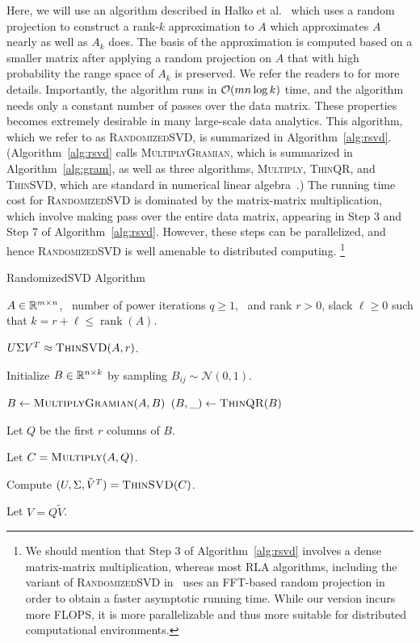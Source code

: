 Here, we will use an algorithm described in Halko et al.~\cite{HMT09_SIREV} which uses a random projection to construct a rank-$k$ approximation to $A$ which approximates $A$ nearly as well as $A_k$ does.
The basis of the approximation is computed based on a smaller matrix after applying a random projection on $A$ that with high probability the range space of $A_k$ is preserved. We refer the readers to \cite{HMT09_SIREV,Mah-mat-rev_BOOK} for more details.
Importantly, the algorithm runs in $\operatorname{\mathcal{O}}(mn \log k)$ time, and the algorithm needs only a constant number of passes over the data matrix. 
These properties becomes extremely desirable in many large-scale data analytics. 
This algorithm, which we refer to as \textsc{RandomizedSVD}, is summarized in Algorithm~\ref{alg:rsvd}.
(Algorithm~\ref{alg:rsvd} calls \textsc{MultiplyGramian}, which is summarized in Algorithm~\ref{alg:gram}, as well as three algorithms, \textsc{Multiply}, \textsc{ThinQR}, and \textsc{ThinSVD}, which are standard in numerical linear algebra~\cite{GVL96}.) 
The running time cost for \textsc{RandomizedSVD} is dominated by the matrix-matrix multiplication, which involve making pass over the entire data matrix, appearing in Step 3 and Step 7 of Algorithm~\ref{alg:rsvd}.
However, these steps can be parallelized, and hence \textsc{RandomizedSVD} is well amenable to distributed computing.%
\footnote{We should mention that Step 3 of Algorithm~\ref{alg:rsvd} involves a dense matrix-matrix multiplication, whereas most RLA algorithms, including the variant of \textsc{RandomizedSVD} in~\cite{HMT09_SIREV} uses an FFT-based random projection in order to obtain a faster asymptotic running time.  While our version incurs more FLOPS, it is more parallelizable and thus more suitable for distributed computational environments.}


\begin{algorithm}[tb]
 \caption{{\sc RandomizedSVD} Algorithm}
  \label{alg:rsvd}
  \begin{algorithmic}[1]
    \Require $A \in \mathbb{R}^{m\times n}$, \
      number of power iterations $q \ge 1$, \
      and rank $r > 0$, slack $\ell \ge 0$ such that $k=r+\ell \leq \operatorname{rank}(A)$.

    \Ensure $U \Sigma V^T \approx \Call{ThinSVD}{A, r}$.

    \State Initialize $B \in \mathbb{R}^{n\times k}$ by sampling $B_{ij} \sim \mathcal{N}(0, 1)$.

    \For{$q$ times}
        \State $B \gets \Call{MultiplyGramian}{A, B}$
        \State $(B, \_) \gets \Call{ThinQR}{B}$
    \EndFor

    \State Let $Q$ be the first $r$ columns of $B$.

    \State Let $C = \Call{Multiply}{A, Q}$.

    \State Compute $(U, \Sigma, \tilde V^T) = \Call{ThinSVD}{C}$.

    \State Let $V = Q \tilde V$.

    \end{algorithmic}
\end{algorithm}

